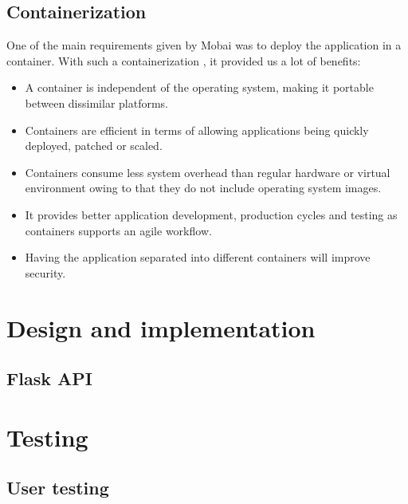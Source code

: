 






\subsection*{Containerization}
One of the main requirements given by Mobai was to deploy the application in a container. With such a containerization \cite{Containerization}, it provided us a lot of benefits:
\begin{itemize}
    \item A container is independent of the operating system, making it portable between dissimilar platforms. 
    \item Containers are efficient in terms of allowing applications being quickly deployed, patched or scaled. 
    \item Containers consume less system overhead than regular hardware or virtual environment owing to that they do not include operating system images. 
    \item It provides better application development, production cycles and testing as containers supports an agile workflow.
    \item Having the application separated into different containers will improve security. 
\end{itemize}

\section{Design and implementation}

\subsection{Flask API}

\section{Testing}

\subsection{User testing}

